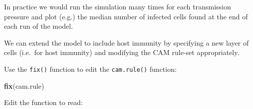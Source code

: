 \documentclass[12pt,a4paper]{book}
\newenvironment{Shaded}{\begin{snugshade}}{\end{snugshade}}
\newcommand{\KeywordTok}[1]{\textcolor[rgb]{0.13,0.29,0.53}{\textbf{#1}}}
\newcommand{\DataTypeTok}[1]{\textcolor[rgb]{0.13,0.29,0.53}{#1}}
\newcommand{\DecValTok}[1]{\textcolor[rgb]{0.00,0.00,0.81}{#1}}
\newcommand{\FloatTok}[1]{\textcolor[rgb]{0.00,0.00,0.81}{#1}}
\newcommand{\StringTok}[1]{\textcolor[rgb]{0.31,0.60,0.02}{#1}}
\newcommand{\ControlFlowTok}[1]{\textcolor[rgb]{0.13,0.29,0.53}{\textbf{#1}}}
\newcommand{\OperatorTok}[1]{\textcolor[rgb]{0.81,0.36,0.00}{\textbf{#1}}}
\newcommand{\NormalTok}[1]{#1}
\theoremstyle{definition}
\theoremstyle{definition}
\theoremstyle{definition}
\theoremstyle{remark}
\begin{document}
\begin{Shaded}
\end{Shaded}

In practice we would run the simulation many times for each transmission
pressure and plot (e.g.) the median number of infected cells found at
the end of each run of the model.

We can extend the model to include host immunity by specifying a new
layer of cells (i.e.~for host immunity) and modifying the CAM rule-set
appropriately.

Use the \texttt{fix()} function to edit the \texttt{cam.rule()}
function:

\begin{Shaded}
\begin{Highlighting}[]
\KeywordTok{fix}\NormalTok{(cam.rule)}
\end{Highlighting}
\end{Shaded}

Edit the function to read:
\end{document}
